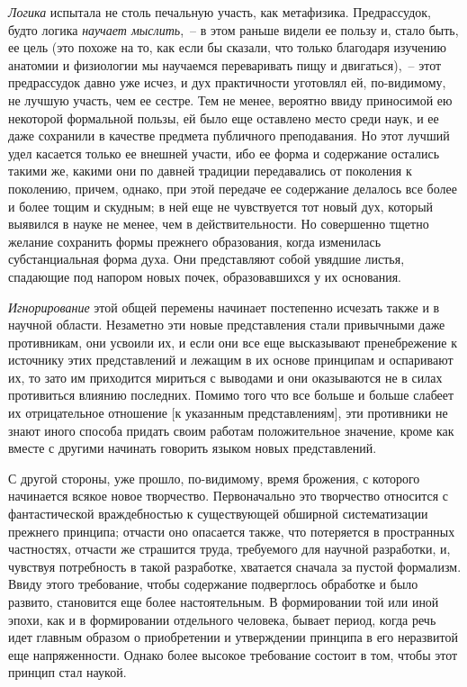 \emph{Логика} испытала не столь печальную участь, как метафизика.
Предрассудок, будто логика \emph{научает мыслить},~--
в этом раньше видели ее пользу и, стало быть,
ее цель (это похоже на то, как если бы сказали, что
только благодаря изучению анатомии и физиологии мы
научаемся переваривать пищу и двигаться),~-- этот предрассудок
давно уже исчез, и дух практичности уготовлял
ей, по-видимому, не лучшую участь, чем ее сестре. Тем
не менее, вероятно ввиду приносимой ею некоторой формальной
пользы, ей было еще оставлено место среди наук,
и ее даже сохранили в качестве предмета публичного
преподавания. Но этот лучший удел касается только ее
внешней участи, ибо ее форма и содержание остались
такими же, какими они по давней традиции передавались
от поколения к поколению, причем, однако, при
этой передаче ее содержание делалось все более и более
тощим и скудным; в ней еще не чувствуется тот новый
дух, который выявился в науке не менее, чем в действительности.
Но совершенно тщетно желание сохранить
формы прежнего образования, когда изменилась субстанциальная
форма духа. Они представляют собой увядшие
листья, спадающие под напором новых почек, образовавшихся
у их основания.

\emph{Игнорирование} этой общей перемены начинает постепенно
исчезать также и в научной области. Незаметно
эти новые представления стали привычными даже
противникам, они усвоили их, и если они все еще высказывают
пренебрежение к источнику этих представлений
и лежащим в их основе принципам и оспаривают
их, то зато им приходится мириться с выводами и они
оказываются не в силах противиться влиянию последних.
Помимо того что все больше и больше слабеет их
отрицательное отношение [к указанным представлениям],
эти противники не знают иного способа придать своим работам
положительное значение, кроме как вместе с другими
начинать говорить языком новых представлений.

С другой стороны, уже прошло, по-видимому, время
брожения, с которого начинается всякое новое творчество.
Первоначально это творчество относится с фантастической
враждебностью к существующей обширной систематизации
прежнего принципа; отчасти оно опасается
также, что потеряется в пространных частностях, отчасти
же страшится труда, требуемого для научной разработки,
и, чувствуя потребность в такой разработке, хватается
сначала за пустой формализм. Ввиду этого требование,
чтобы содержание подверглось обработке и было
развито, становится еще более настоятельным. В формировании
той или иной эпохи, как и в формировании отдельного
человека, бывает период, когда речь идет главным
образом о приобретении и утверждении принципа в его
неразвитой еще напряженности. Однако более высокое
требование состоит в том, чтобы этот принцип стал
наукой.

